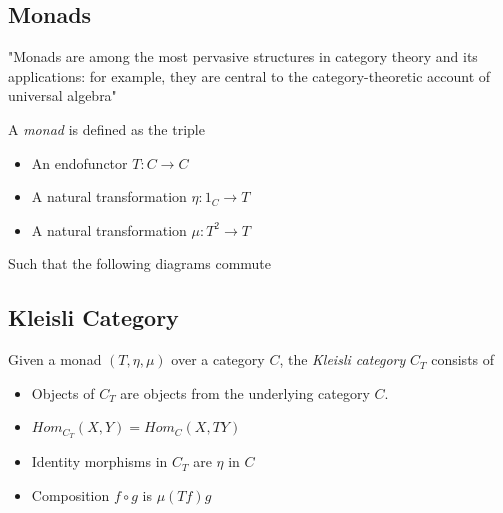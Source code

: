 \subsection{Monads}
"Monads are among the most pervasive structures in category theory
and its applications: for example, they are central to the category-theoretic account of universal algebra"
\cite{mac2013categories}
\begin{definition}
    A \textit{monad} is defined as the triple
    \begin{itemize}
        \item An endofunctor $T : C \rightarrow C$
        \item A natural transformation $\eta : 1_{C} \rightarrow T$
        \item A natural transformation $\mu : T^2 \rightarrow T$
    \end{itemize}
    Such that the following diagrams commute
    \begin{center}
        \quad
    \end{center}
\end{definition}

\subsection{Kleisli Category}
\begin{definition}
    Given a monad $(T,\eta,\mu)$ over a category $C$,
    the \textit{Kleisli category} $C_T$ consists of
    \begin{itemize}
        \item Objects of $C_T$ are objects from the underlying category $C$.
        \item $Hom_{C_T}(X,Y) = Hom_C (X,TY)$
        \item Identity morphisms in $C_T$ are $\eta$ in $C$
        \item Composition $f \circ g$ is $\mu(Tf)g$
    \end{itemize}
\end{definition}

